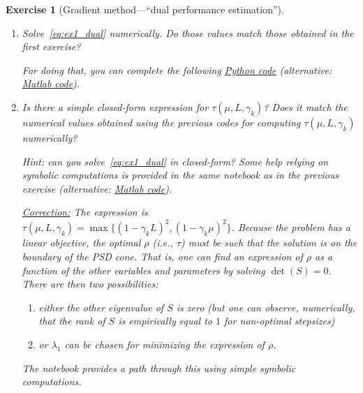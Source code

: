 \documentclass[11pt,a4paper]{article}
\newcommand{\correction}[1]{{{\color{blue}\underline{Correction:} #1}}}
\newcommand{\correction}[1]{}
\newtheorem{exercise}{Exercise}
\begin{document}
\begin{exercise}[Gradient method---``dual performance estimation'']
\begin{enumerate}
An advantage of this approach is that it allows to easily obtain the dual formulations using symbolic computation (see, e.g., \href{https://github.com/PerformanceEstimation/Learning-Performance-Estimation/blob/main/Codes/Jupyter/Exercise02.ipynb}{Python this notebook}, or this \href{https://github.com/PerformanceEstimation/Learning-Performance-Estimation/blob/main/Codes/Matlab/Exercise2_symbolicalLMI.m}{Matlab file}).
		
		\correction{Because all expressions in the Lagrangian are quadratics in $(x_k-x_\star,g_k)$ and linear in $f_k-f_\star$, the gradient and Hessian of the Lagrangian respectively with respect to $f_k$ and to $(x_k,g_k)$ actually corresponds to the matrices $s$ and $S$ such that \[\mathrm{Trace}(-SG)+ s F=\mathcal{L}(x_k,g_k,f_k,x_\star,f_\star;\lambda_1,\lambda_2,\rho),\] where $G$ is the previously defined Gram matrix~\eqref{ex1:eq:GRAM}.}
		
	
	\item Solve~\eqref{eq:ex1_dual} numerically. Do those values match those obtained in the first exercise? 
	
	For doing that, you can complete the following \href{https://github.com/PerformanceEstimation/Learning-Performance-Estimation/tree/main/Codes/Jupyter/Exercise02.ipynb}{Python code} (alternative: \href{https://github.com/PerformanceEstimation/Learning-Performance-Estimation/blob/main/Codes/Matlab/Exercise2.m}{Matlab code}).

	\item Is there a simple closed-form expression for $\tau(\mu,L,\gamma_k)$? Does it match the numerical values obtained using the previous codes for computing $\tau(\mu,L,\gamma_k)$ numerically?
	
	Hint: can you solve~\eqref{eq:ex1_dual}	in closed-form?	Some help relying on symbolic computations is provided in the same notebook as in the previous exercise (alternative: \href{https://github.com/PerformanceEstimation/Learning-Performance-Estimation/blob/main/Codes/Matlab/Exercise2_closedform.m}{Matlab code}).
	
	
	
	\correction{The expression is $\tau(\mu,L,\gamma_k)=\max\{(1-\gamma_k L)^2,(1-\gamma_k\mu)^2\}$. Because the problem has a linear objective, the optimal $\rho$ (i.e., $\tau$) must be such that the solution is on the boundary of the PSD cone. That is, one can find an expression of $\rho$ as a function of the other variables and parameters by solving $\det(S)=0$. There are then two possibilities:
	\begin{enumerate}
	\item either the other eigenvalue of $S$ is zero (but one can observe, numerically, that the rank of $S$ is empirically equal to $1$ for non-optimal stepsizes)
	\item or $\lambda_1$ can be chosen for minimizing the expression of $\rho$.
	\end{enumerate}
The notebook provides a path through this using simple symbolic computations.	
}
	

\end{enumerate}
\end{exercise}
\end{document}

